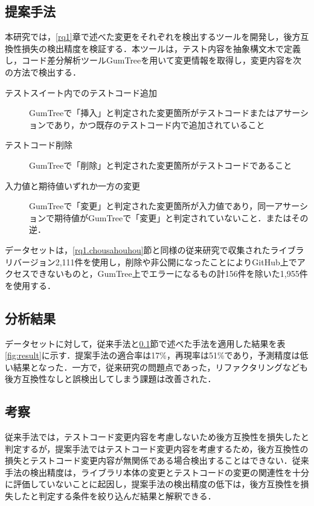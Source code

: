 \documentclass[twocolumn]{jarticle} %
\begin{document}
\subsection{提案手法}\label{teiannshuhou}
本研究では，\ref{rq1}章で述べた変更をそれぞれを検出するツールを開発し，後方互換性損失の検出精度を検証する．本ツールは，テスト内容を抽象構文木で定義し，コード差分解析ツールGumTree\cite{gumtree}を用いて変更情報を取得し，変更内容を次の方法で検出する．

\begin{description}
  \item[テストスイート内でのテストコード追加]GumTreeで「挿入」と判定された変更箇所がテストコードまたはアサーションであり，かつ既存のテストコード内で追加されていること
  \item[テストコード削除]GumTreeで「削除」と判定された変更箇所がテストコードであること
  \item[入力値と期待値いずれか一方の変更]GumTreeで「変更」と判定された変更箇所が入力値であり，同一アサーションで期待値がGumTreeで「変更」と判定されていないこと．またはその逆．
\end{description}

データセットは，\ref{rq1.chousahouhou}節と同様の従来研究\cite{matsuda}で収集されたライブラリバージョン2,111件を使用し，削除や非公開になったことによりGitHub上でアクセスできないものと，GumTree上でエラーになるもの計156件を除いた1,955件を使用する．

\subsection{分析結果}

データセットに対して，従来手法と\ref{teiannshuhou}節で述べた手法を適用した結果を表\ref{fig:result}に示す．提案手法の適合率は17\%，再現率は51\%であり，予測精度は低い結果となった．一方で，従来研究の問題点であった，リファクタリングなども後方互換性なしと誤検出してしまう課題は改善された．

\subsection{考察}
従来手法では，テストコード変更内容を考慮しないため後方互換性を損失したと判定するが，提案手法ではテストコード変更内容を考慮するため，後方互換性の損失とテストコード変更内容が無関係である場合検出することはできない．従来手法の検出精度は，ライブラリ本体の変更とテストコードの変更の関連性を十分に評価していないことに起因し，提案手法の検出精度の低下は，後方互換性を損失したと判定する条件を絞り込んだ結果と解釈できる．
\end{document}
